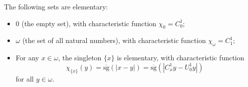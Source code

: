The following sets are elementary:
\begin{itemize}
\item[(i)] $0$ (the empty set), with characteristic function $\chi_0 = C_0^1$;
\item[(ii)] $\omega$ (the set of all natural numbers), with characteristic function $\chi_\omega = C_1^1$;
\item[(iii)] For any $x \in \omega$, the singleton $\{x\}$ is elementary, with characteristic function
$$\chi_{\{x\}}(y) = \overline{\text{sg}}(|x - y|) = \overline{\text{sg}}(|C_x^1 y - U_0^1 y|)$$
for all $y \in \omega$.
\end{itemize}
